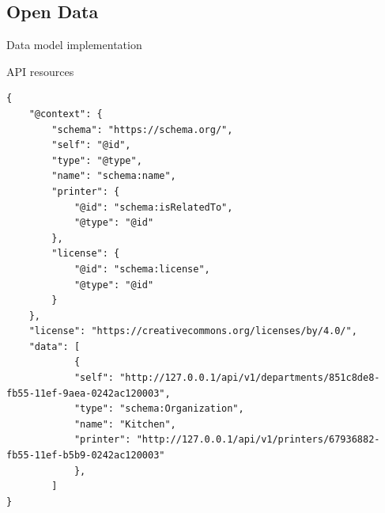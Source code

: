 \subsection[Open Data]{Open Data}

\begin{frame}[allowframebreaks]{Data model implementation}
	
	
\end{frame}

\begin{frame}{API resources}
	
\end{frame}

\begin{frame}[fragile]
	\begin{lstlisting}[style=JSONStyle,caption={\texttt{GET /api/v1/departments} response}]
{
	"@context": {
		"schema": "https://schema.org/",
		"self": "@id",
		"type": "@type",
		"name": "schema:name",
		"printer": {
			"@id": "schema:isRelatedTo",
			"@type": "@id"
		},
		"license": {
			"@id": "schema:license",
			"@type": "@id"
		}
	},
	"license": "https://creativecommons.org/licenses/by/4.0/",
	"data": [
			{
			"self": "http://127.0.0.1/api/v1/departments/851c8de8-fb55-11ef-9aea-0242ac120003",
			"type": "schema:Organization",
			"name": "Kitchen",
			"printer": "http://127.0.0.1/api/v1/printers/67936882-fb55-11ef-b5b9-0242ac120003"
			},
		]
}\end{lstlisting}
\end{frame}

